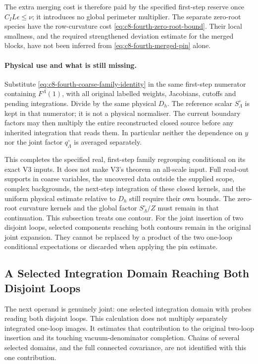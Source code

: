 \documentclass[11pt]{article}
\begin{document}
The extra merging cost is therefore paid by the specified
first-step reserve once $C_I L\epsilon\leq\nu$; it introduces
no global perimeter multiplier. The separate zero-root
species have the row-curvature cost
\eqref{eq:c8-fourth-zero-root-bound}. Their local smallness,
and the required strengthened deviation estimate for the
merged blocks, have not been inferred from
\eqref{eq:c8-fourth-merged-pin} alone.

\paragraph{Physical use and what is still missing.}
Substitute \eqref{eq:c8-fourth-coarse-family-identity} in the
same first-step numerator containing $F^\Lambda(1)$, with
all original labelled weights, Jacobians, cutoffs and pending
integrations. Divide by the same physical $D_h$.
The reference scalar $S^\circ_\Lambda$ is kept in that
numerator; it is not a physical normaliser. The current
boundary factors may then multiply the entire reconstructed
closed source before any inherited integration that reads
them. In particular neither the dependence on $y$ nor the
joint factor $q^\circ_\Lambda$ is averaged separately.

This completes the specified real, first-step family
regrouping conditional on its exact V3 inputs. It does not
make V3's theorem an all-scale input. Full read-out supports
in coarse variables, the uncovered data outside the supplied
scope, complex backgrounds, the next-step integration of
these closed kernels, and the uniform physical estimate
relative to $D_h$ still require their own bounds. The
zero-root curvature kernels and the global factor
$S^\circ_\Lambda/Z$ must remain in that continuation.
This subsection treats one contour. For the joint insertion of
two disjoint loops, selected components reaching both contours remain in
the original joint expansion. They cannot be replaced by a
product of the two one-loop conditional expectations or
discarded when applying the pin estimate.

\subsection{A Selected Integration Domain Reaching Both Disjoint Loops}
\label{sec:c8-fourth-disjoint-root}

The next operand is genuinely joint: one selected integration
domain with probes reading both disjoint loops. This calculation
does not multiply separately integrated one-loop images. It
estimates that contribution to the original two-loop insertion
and its touching vacuum-denominator completion. Chains of
several selected domains, and the full connected covariance,
are not identified with this one contribution.
\end{document}
